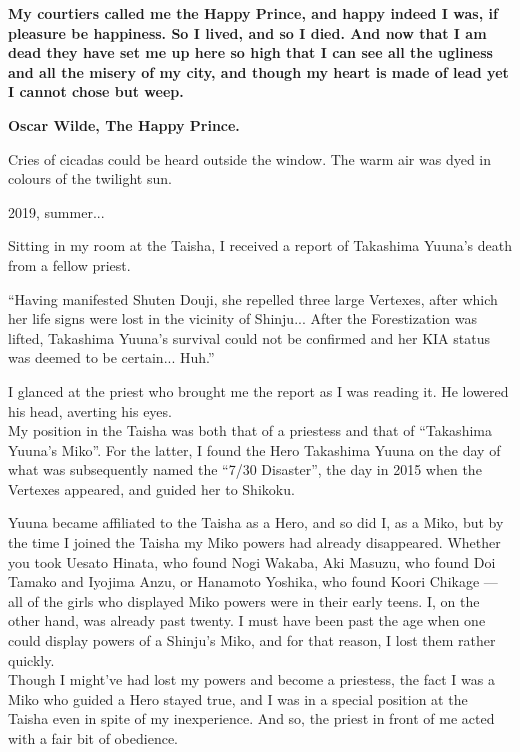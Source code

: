 
\begin{center}
\begin{tcolorbox}[width=0.75\textwidth,colback=darkgray,colupper=white]
\textbf{My courtiers called me the Happy Prince, and happy indeed I was, if pleasure be happiness.  So I lived, and so I died.  And now that I am dead they have set me up here so high that I can see all the ugliness and all the misery of my city, and though my heart is made of lead yet I cannot chose but weep.}

\bigskip

\textbf{Oscar Wilde, The Happy Prince.}
\end{tcolorbox}
\end{center}

Cries of cicadas could be heard outside the window. The warm air was dyed in colours of the twilight sun.

2019, summer...

Sitting in my room at the Taisha, I received a report of Takashima Yuuna's death from a fellow priest.

``Having manifested Shuten Douji, she repelled three large Vertexes, after which her life signs were lost in the vicinity of Shinju... After the Forestization was lifted, Takashima Yuuna's survival could not be confirmed and her KIA status was deemed to be certain... Huh.''

I glanced at the priest who brought me the report as I was reading it. He lowered his head, averting his eyes. \\
My position in the Taisha was both that of a priestess and that of ``Takashima Yuuna's Miko''. For the latter, I found the Hero Takashima Yuuna on the day of what was subsequently named the ``7/30 Disaster'', the day in 2015 when the Vertexes appeared, and guided her to Shikoku.

Yuuna became affiliated to the Taisha as a Hero, and so did I, as a Miko, but by the time I joined the Taisha my Miko powers had already disappeared. Whether you took Uesato Hinata, who found Nogi Wakaba, Aki Masuzu, who found Doi Tamako and Iyojima Anzu, or Hanamoto Yoshika, who found Koori Chikage --- all of the girls who displayed Miko powers were in their early teens. I, on the other hand, was already past twenty. I must have been past the age when one could display powers of a Shinju's Miko, and for that reason, I lost them rather quickly. \\
Though I might've had lost my powers and become a priestess, the fact I was a Miko who guided a Hero stayed true, and I was in a special position at the Taisha even in spite of my inexperience. And so, the priest in front of me acted with a fair bit of obedience.

